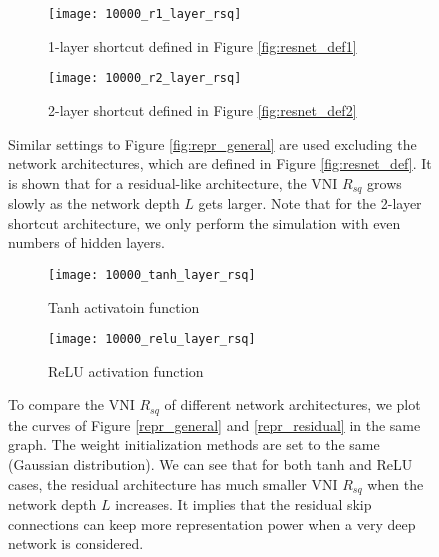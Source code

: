 \begin{figure}[h]
    \centering
    \newcommand{\myWidth}{0.9\textwidth}
    \begin{subfigure}{\myWidth}
      \centering
      \caption{1-layer shortcut defined in Figure \ref{fig:resnet_def1}}
      \texttt{[image: 10000\_r1\_layer\_rsq]}
      \label{fig:repr_residual_a}
    \end{subfigure}
    
    \begin{subfigure}{\myWidth}
      \centering
      \caption{2-layer shortcut defined in Figure \ref{fig:resnet_def2}}
      \texttt{[image: 10000\_r2\_layer\_rsq]}
      \label{fig:repr_residual_b}
    \end{subfigure}%
    \caption[The initial VNI $R_{sq}$ of residual networks.]{
    Similar settings to Figure \ref{fig:repr_general} are used excluding the network architectures,
    which are defined in Figure \ref{fig:resnet_def}.
    It is shown that for a residual-like architecture, the VNI $R_{sq}$ grows slowly as the network
    depth $L$ gets larger.
    Note that for the 2-layer shortcut architecture, we only perform the simulation with even numbers
    of hidden layers.}
    \label{fig:repr_residual}
\end{figure}


\begin{figure}[h]
    \centering
    \newcommand{\myWidth}{0.9\textwidth}
    \begin{subfigure}{\myWidth}
      \centering
      \caption{Tanh activatoin function}
      \texttt{[image: 10000\_tanh\_layer\_rsq]}
      \label{fig:repr_architecture_a}
    \end{subfigure}
    
    \begin{subfigure}{\myWidth}
      \centering
      \caption{ReLU activation function}
      \texttt{[image: 10000\_relu\_layer\_rsq]}
      \label{fig:repr_architecture_b}
    \end{subfigure}%
    \caption[The initial VNI $R_{sq}$ of different network architectures.]{
    To compare the VNI $R_{sq}$ of different network architectures, we plot the curves of Figure
    \ref{repr_general} and \ref{repr_residual} in the same graph.
    The weight initialization methods are set to the same (Gaussian distribution).
    We can see that for both tanh and ReLU cases, the residual architecture has much smaller VNI
    $R_{sq}$ when the network depth $L$ increases.
    It implies that the residual skip connections can keep more representation power when a very deep
    network is considered.
    }
    \label{fig:repr_architecture}
\end{figure}


